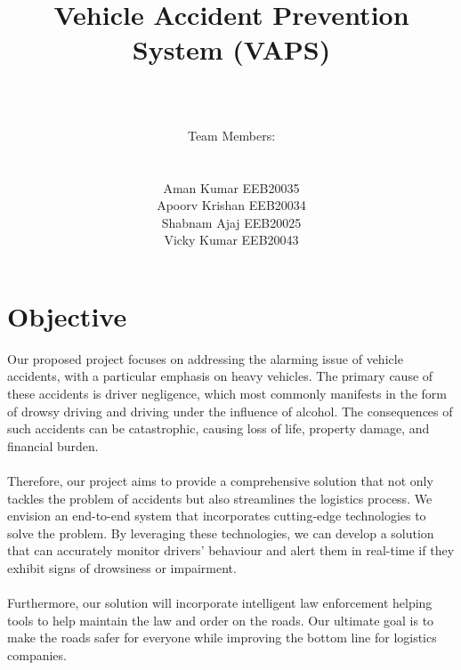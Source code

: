 \documentclass[12pt]{article}
\title{ \begin{center} \LARGE Vehicle Accident Prevention System (VAPS) \end{center} }
\author{\\ \\Team Members: 
\\
\\
\\
Aman Kumar EEB20035\\
Apoorv Krishan EEB20034\\
Shabnam Ajaj EEB20025\\
Vicky Kumar EEB20043\\}
\date{}
\begin{document}
\maketitle
\newpage
\tableofcontents

\newpage

\section{Objective}
Our proposed project focuses on addressing the alarming issue of vehicle accidents, with a particular emphasis on heavy vehicles. The primary cause of these accidents is driver negligence, which most commonly manifests in the form of drowsy driving and driving under the influence of alcohol. The consequences of such accidents can be catastrophic, causing loss of life, property damage, and financial burden.
\\
\\
Therefore, our project aims to provide a comprehensive solution that not only tackles the problem of accidents but also streamlines the logistics process. We envision an end-to-end system that incorporates cutting-edge technologies to solve the problem. By leveraging these technologies, we can develop a solution that can accurately monitor drivers' behaviour and alert them in real-time if they exhibit signs of drowsiness or impairment.
\\
\\
Furthermore, our solution will incorporate intelligent law enforcement helping tools to help maintain the law and order on the roads. Our ultimate goal is to make the roads safer for everyone while improving the bottom line for logistics companies.
\end{document}
